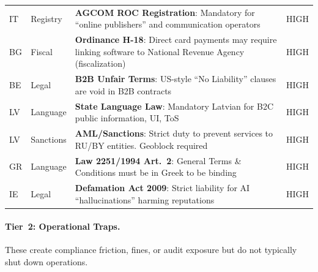 \documentclass[11pt,a4paper]{article}
\begin{document}
\begin{longtable}{@{}llp{6cm}l@{}}
IT & Registry & \textbf{AGCOM ROC Registration}: Mandatory for ``online publishers'' and communication operators & HIGH \\
BG & Fiscal & \textbf{Ordinance H-18}: Direct card payments may require linking software to National Revenue Agency (fiscalization) & HIGH \\
BE & Legal & \textbf{B2B Unfair Terms}: US-style ``No Liability'' clauses are void in B2B contracts & HIGH \\
LV & Language & \textbf{State Language Law}: Mandatory Latvian for B2C public information, UI, ToS & HIGH \\
LV & Sanctions & \textbf{AML/Sanctions}: Strict duty to prevent services to RU/BY entities. Geoblock required & HIGH \\
GR & Language & \textbf{Law 2251/1994 Art.~2}: General Terms \& Conditions must be in Greek to be binding & HIGH \\
IE & Legal & \textbf{Defamation Act 2009}: Strict liability for AI ``hallucinations'' harming reputations & HIGH \\
\end{longtable}

\paragraph{Tier~2: Operational Traps.}
These create compliance friction, fines, or audit exposure but do not typically shut down operations.
\end{document}
